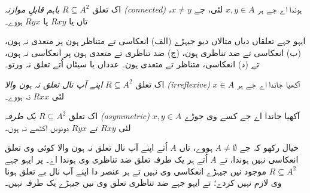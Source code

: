 \documentclass[../../../include/open-logic-section]{subfiles}
\begin{document}
\begin{defn}
اک تعلق $R \subseteq A^2$ \emph{باہم قابلِ موازنہ (connected)} ہوندا اے جے ہر $x,y\in
A$ لئی، جے $x \neq y$، تاں یا $Rxy$ یا $Ryx$ ہووے۔
\end{defn}

\begin{prob}
ایہو جہے تعلقاں دیاں مثالاں دیو جیہڑے (الف) انعکاسی تے متناظر ہون پر
متعدی نہ ہون، (ب) انعکاسی تے ضد تناظری ہون، (ج) ضد تناظری تے متعدی
ہون پر انعکاسی نہ ہون، تے (د) انعکاسی، متناظر تے متعدی ہون۔ عدداں یا
سیٹاں اُتے تعلق نہ ورتو۔
\end{prob}
 
\begin{defn}
اک تعلق $R \subseteq A^2$ \emph{اپنے آپ نال تعلق نہ ہون والا (irreflexive)} آکھیا جاندا
اے جے ہر $x \in A$ لئی $Rxx$ نہ ہووے۔
\end{defn}

\begin{defn}
اک تعلق $R \subseteq A^2$ \emph{یک طرفہ (asymmetric)} آکھیا جاندا اے جے کسے وی جوڑے
$x,y\in A$ لئی $Rxy$ تے $Ryx$ دونویں اکٹھے نہ ہون۔
\end{defn}

خیال رکھو کہ جے $A \neq \emptyset$ ہووے، تاں $A$ اُتے اپنے آپ نال تعلق
نہ ہون والا کوئی وی تعلق انعکاسی نہیں ہوندا، تے $A$ اُتے ہر یک طرفہ تعلق
ضد تناظری وی ہوندا اے۔ پر ایہو جہے $R \subseteq A^2$ موجود نیں جیہڑے
انعکاسی وی نہیں تے ہر عنصر دا اپنے آپ نال بے تعلق ہونا وی لازم نہیں کردے؛ تے ایہو جہے ضد تناظری
تعلق وی نیں جیہڑے یک طرفہ نہیں۔
\end{document}
